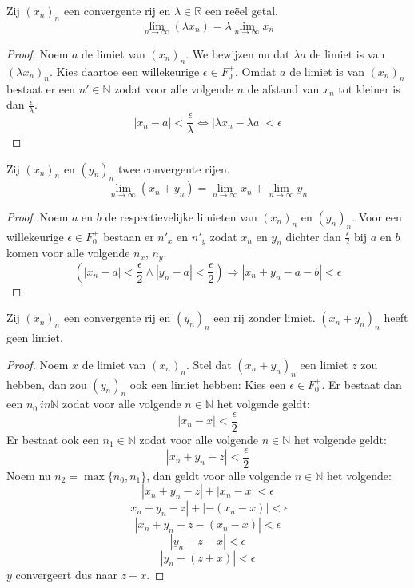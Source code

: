 \documentclass[main.tex]{subfiles}
\begin{document}
\begin{st}
  Zij $(x_{n})_{n}$ een convergente rij en $\lambda\in \mathbb{R}$ een re\"eel getal.
  \[ \lim_{n \rightarrow \infty}(\lambda x_{n}) = \lambda \lim_{n\rightarrow \infty}x_{n} \]

  \begin{proof}
    Noem $a$ de limiet van $(x_{n})_{n}$.
    We bewijzen nu dat $\lambda a$ de limiet is van $(\lambda x_{n})_{n}$.
    Kies daartoe een willekeurige $\epsilon \in F_{0}^{+}$.
    Omdat $a$ de limiet is van $(x_{n})_{n}$ bestaat er een $n'\in \mathbb{N}$ zodat voor alle volgende $n$ de afstand van $x_{n}$ tot kleiner is dan $\frac{\epsilon}{\lambda}.$
    \[ |x_{n}-a| < \frac{\epsilon}{\lambda} \Leftrightarrow |\lambda x_{n}-\lambda a| < \epsilon \]
  \end{proof}
\end{st}

\begin{st}
  \label{st:som-van-limieten-is-limiet-van-som}
  Zij $(x_{n})_{n}$ en $(y_{n})_{n}$ twee convergente rijen.
  \[ \lim_{n \rightarrow \infty}(x_{n}+y_{n}) = \lim_{n\rightarrow \infty}x_{n} + \lim_{n\rightarrow \infty}y_{n} \]

  \begin{proof}
    Noem $a$ en $b$ de respectievelijke limieten van $(x_{n})_{n}$ en $(y_{n})_{n}$.
    Voor een willekeurige $\epsilon \in F_{0}^{+}$ bestaan er $n'_{x}$ en $n'_{y}$ zodat $x_{n}$ en $y_{n}$ dichter dan $\frac{\epsilon}{2}$ bij $a$ en $b$ komen voor alle volgende $n_{x}$, $n_{y}$.
    \[ \left( |x_{n}-a| < \frac{\epsilon}{2} \wedge |y_{n}-a| < \frac{\epsilon}{2} \right) \Rightarrow |x_{n}+y_{n} - a-b| < \epsilon \]
  \end{proof}
\end{st}

\begin{st}
  Zij $(x_{n})_{n}$ een convergente rij en $(y_{n})_{n}$ een rij zonder limiet.
  $(x_{n}+y_{n})_{n}$ heeft geen limiet.
  
  \begin{proof}
    Noem $x$ de limiet van $(x_{n})_{n}$.
    Stel dat $(x_{n}+y_{n})_{n}$ een limiet $z$ zou hebben, dan zou $(y_{n})_{n}$ ook een limiet hebben:
    Kies een $\epsilon \in F_{0}^{+}$.
    Er bestaat dan een $n_{0}\ in \mathbb{N}$ zodat voor alle volgende $n\in \mathbb{N}$ het volgende geldt:
    \[ |x_{n}-x| < \frac{\epsilon}{2} \]
    Er bestaat ook een $n_{1}\in \mathbb{N}$ zodat voor alle volgende $n\in \mathbb{N}$ het volgende geldt:
    \[ |x_{n}+y_{n}-z| < \frac{\epsilon}{2} \]
    Noem nu $n_{2} = \max\{n_{0},n_{1}\}$, dan geldt voor alle volgende $n\in \mathbb{N}$ het volgende:
    \[ |x_{n}+y_{n}-z|+|x_{n}-x| < \epsilon \]
    \[ |x_{n}+y_{n}-z|+|-(x_{n}-x)| < \epsilon \]
    \[ |x_{n}+y_{n}-z-(x_{n}-x)| < \epsilon \]
    \[ |y_{n}-z-x| < \epsilon \]
    \[ |y_{n}-(z+x)| < \epsilon \]
    $y$ convergeert dus naar $z+x$.
\feed
  \end{proof}
\end{st}
\end{document}
